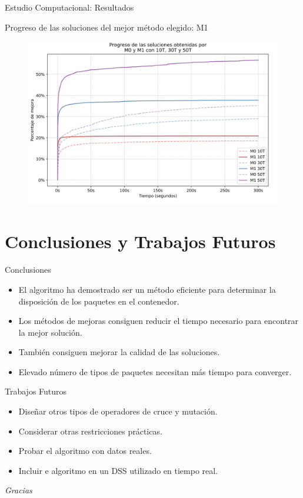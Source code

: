 \documentclass[handout]{beamer}
\begin{document}
\begin{frame}{Estudio Computacional: Resultados}
    \begin{exampleblock}{Progreso de las soluciones del mejor método elegido: M1}
        \begin{figure}
            \centering
            \includegraphics[width=0.8\linewidth]{pic/exp-progreso-soluciones.png}
        \end{figure}
    \end{exampleblock}
\end{frame}

\section[Conclusiones]{Conclusiones y Trabajos Futuros}

\begin{frame}{Conclusiones}
    \begin{itemize}[<+-| alert@+>]
        \item El algoritmo ha demostrado ser un método eficiente para determinar la disposición de los paquetes en el contenedor.
        \item Los métodos de mejoras consiguen reducir el tiempo necesario para encontrar la mejor solución.
        \item También consiguen mejorar la calidad de las soluciones.
        \item Elevado número de tipos de paquetes necesitan más tiempo para converger.
    \end{itemize}
\end{frame}

\begin{frame}{Trabajos Futuros}
    \begin{itemize}[<+-| alert@+>]
        \item Diseñar otros tipos de operadores de cruce y mutación.
        \item Considerar otras restricciones prácticas.
        \item Probar el algoritmo con datos reales.
        \item Incluir e  algoritmo en un DSS utilizado en tiempo real.
    \end{itemize}
\end{frame}

\begin{frame}
    \begin{center}
        {\Huge \textit{\selectfont Gracias}}
    \end{center}
\end{frame}
\end{document}
